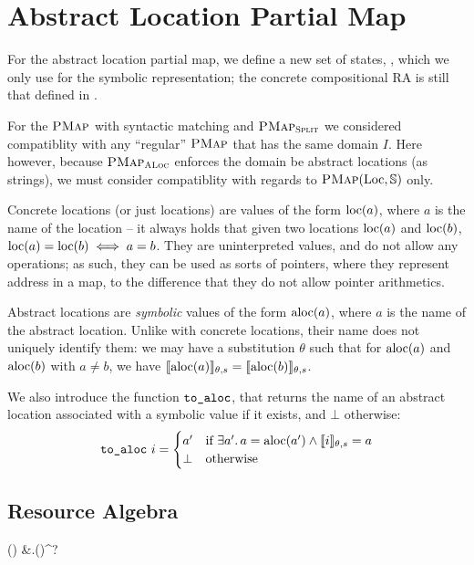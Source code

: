 \section{Abstract Location Partial Map}

For the abstract location partial map, we define a new set of states, \ALocPMap, which we only use for the symbolic representation; the concrete compositional RA is still that defined in \PMap. 

For the $\textsc{PMap}$ with syntactic matching and $\textsc{PMap}_{\textsc{Split}}$ we considered compatiblity with any ``regular'' $\textsc{PMap}$ that has the same domain $I$. Here however, because $\textsc{PMap}_{\textsc{ALoc}}$ enforces the domain be abstract locations (as strings), we must consider compatiblity with regards to $\textsc{PMap}(\text{Loc}, \mathbb S)$ only.

Concrete locations (or just locations) are values of the form $\text{loc}(a)$, where $a$ is the name of the location -- it always holds that given two locations $\text{loc}(a)$ and $\text{loc}(b)$, $\text{loc}(a)=\text{loc}(b) \iff a=b$. They are uninterpreted values, and do not allow any operations; as such, they can be used as sorts of pointers, where they represent address in a map, to the difference that they do not allow pointer arithmetics.

Abstract locations are \emph{symbolic} values of the form $\text{aloc}(a)$, where $a$ is the name of the abstract location. Unlike with concrete locations, their name does not uniquely identify them: we may have a substitution $\theta$ such that for $\text{aloc}(a)$ and $\text{aloc}(b)$ with $a\neq b$, we have $\llbracket\text{aloc}(a)\rrbracket_{\theta,s} = \llbracket\text{aloc}(b)\rrbracket_{\theta,s}$.

We also introduce the function $\texttt{to\_aloc}$, that returns the name of an abstract location associated with a symbolic value if it exists, and $\bot$ otherwise: \begin{align*}
	\texttt{to\_aloc}~i = \begin{cases}
		a' & \text{if}~\exists a'\ldotp a=\text{aloc}(a') \land \llbracket i\rrbracket_{\theta,s}=a \\
		\bot & \text{otherwise}
	\end{cases}
\end{align*}

\subsection{Resource Algebra}

\begin{breakalign*}
	\ALocPMap(\mmdl) & \Str \finmap \mmdl.\Sigma \times \pset(\Str)^?
\end{breakalign*}

